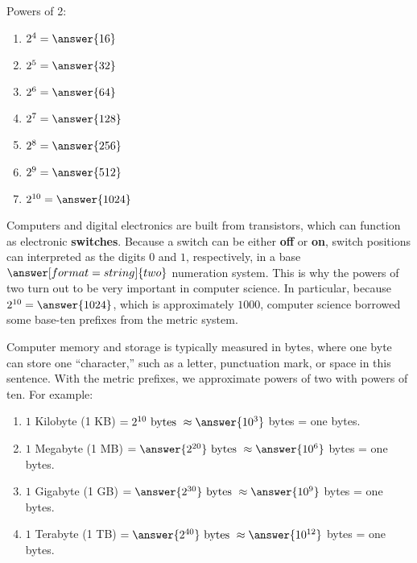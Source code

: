 \documentclass[nooutcomes]{ximera}
\begin{document}
\begin{problem}
Powers of 2:  
\begin{enumerate}
\item $2^4 = \answer{16}$
\item $2^5 = \answer{32}$
\item $2^6 = \answer{64}$
\item $2^7 = \answer{128}$
\item $2^8 = \answer{256}$
\item $2^9 = \answer{512}$
\item $2^{10} = \answer{1024}$
\end{enumerate}
\end{problem}

\begin{problem}
Computers and digital electronics are built from transistors, which can function as electronic \textbf{switches}.  Because a switch can be either \textbf{off} or \textbf{on}, switch positions can interpreted as the digits $0$ and $1$, respectively, 
in a base $\answer[format=string]{two}$ numeration system.  This is why the powers of two turn out to be very important in computer science.  In particular, because $2^{10}=\answer{1024}$, which is approximately $1000$, computer science borrowed some base-ten prefixes from the metric system.  

Computer memory and storage is typically measured in bytes, where one byte can store one ``character,'' such as a letter, punctuation mark, or space in this sentence.  With the metric prefixes, we approximate powers of two with powers of ten.  For example: 
\begin{enumerate}
\item $1$ Kilobyte (1 KB) $=  2^{10}\textrm{ bytes }\approx \answer{10^3}$ bytes = one  bytes.
\item $1$ Megabyte (1 MB) $=  \answer{2^{20}} \textrm{ bytes } \approx \answer{10^6}$ bytes = one  bytes.
\item $1$ Gigabyte (1 GB) $=  \answer{2^{30}} \textrm{ bytes } \approx \answer{10^9}$ bytes = one  bytes.
\item $1$ Terabyte (1 TB) $=  \answer{2^{40}} \textrm{ bytes } \approx \answer{10^{12}}$ bytes = one  bytes.
\end{enumerate}


\end{problem}
\end{document}
